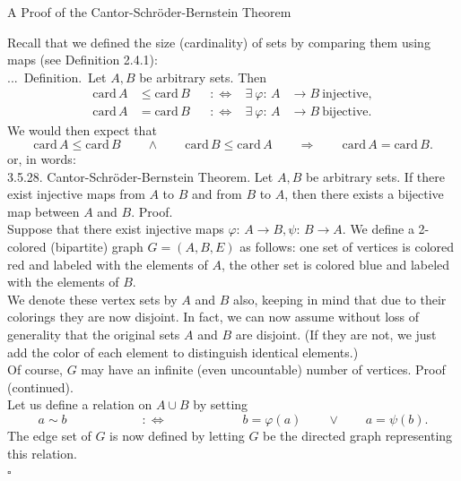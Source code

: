 \documentclass[smaller,hyperref={CJKbookmarks=true}]{beamer}
\newenvironment{PROOF}{{\noindent\!\sf\alert{Proof.}}\\}{\hfill$\square$\\}
\newcounter{zhuo}[subsection]
\renewcommand{\thezhuo}{\thesection.\thesubsection.\arabic{zhuo}}
\newenvironment{DEFINITION}{\stepcounter{zhuo}\alert{\thezhuo.~Definition.\,}}{}
\begin{document}
\begin{frame}{A Proof of the Cantor-Schr\"{o}der-Bernstein Theorem}
\begin{spacing}{1}
Recall that we defined the size (cardinality) of sets by comparing them
using maps (see Definition 2.4.1):\\[5pt]
\begin{DEFINITION}
Let $A,B$ be arbitrary sets. Then
\begin{align*}
  \text{card}\,A&\leq\text{card}\,B & &:\Leftrightarrow & \exists~\varphi\!:\,A&\to B~\text{injective},  \\
  \text{card}\,A&=\text{card}\,B & &:\Leftrightarrow & \exists~\varphi\!:\,A&\to B~\text{bijective}.
\end{align*}
We would then expect that
\[\text{card}\,A\leq\text{card}\,B\qquad\wedge\qquad
\text{card}\,B\leq\text{card}\,A\qquad\Rightarrow\qquad
\text{card}\,A=\text{card}\,B.\]
or, in words:\\[5pt]
\alert{3.5.28. Cantor-Schr\"{o}der-Bernstein Theorem.} Let $A, B$ be arbitrary sets. If
there exist injective maps from $A$ to $B$ and from $B$ to $A$, then there exists
a bijective map between $A$ and $B$.
\end{DEFINITION}
\newpage
\vspace*{9pt}
\begin{PROOF}
Suppose that there exist injective maps $\varphi\!:\,A\to B,\psi\!:\,B\to A$. We define
a 2-colored (bipartite) graph $G = (A, B, E)$ as follows: one set of vertices
is colored red and labeled with the elements of $A$, the other set is colored
blue and labeled with the elements of $B$.\\[7pt]
We denote these vertex sets by $A$ and $B$ also, keeping in mind that due to
their colorings they are now disjoint. In fact, we can now assume without
loss of generality that the original sets $A$ and $B$ are disjoint. (If they are
not, we just add the color of each element to distinguish identical
elements.)\\[6pt]
Of course, $G$ may have an infinite (even uncountable) number of vertices.
\newpage
\vspace*{10pt}
\alert{Proof (continued).}\\
Let us define a relation on $A\cup B$ by setting
\[a\sim b\qquad\qquad\qquad:\Leftrightarrow\qquad\qquad\qquad
b=\varphi(a)\qquad\vee\qquad a=\psi(b).\]
The edge set of $G$ is now defined by letting $G$ be the directed graph
representing this relation.\\[7pt]

\end{PROOF}
\end{spacing}
\end{frame}
\end{document}
